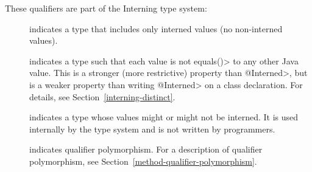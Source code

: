 
These qualifiers are part of the Interning type system:

\begin{description}

\item[]
  indicates a type that includes only interned values (no non-interned
  values).

\item[]
  indicates a type such that each value is not \<equals()> to any other
  Java value.  This is a stronger (more restrictive) property than
  \<@Interned>, but is a weaker property than writing \<@Interned> on a
  class declaration.  For
  details, see Section~\ref{interning-distinct}.

\item[]
  indicates a type whose values might or might not be interned.
  It is used internally by the type system and is not written by programmers.

\item[]
  indicates qualifier polymorphism.
  For a description of qualifier polymorphism, see
  Section~\ref{method-qualifier-polymorphism}.

\end{description}


